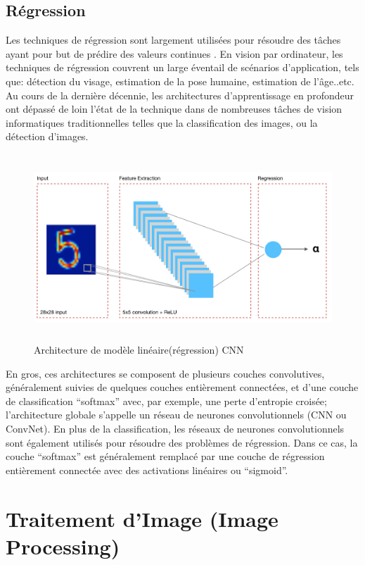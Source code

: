 \documentclass[12pt]{article}
\begin{document}
\subsection{Régression}
Les techniques de régression sont largement utilisées pour résoudre des tâches ayant pour but de prédire des valeurs continues \cite{44}. En vision par ordinateur, les techniques de régression couvrent un large éventail de scénarios d'application, tels que: détection du visage, estimation de la pose humaine, estimation de l'âge..etc. Au cours de la dernière décennie, les architectures d’apprentissage en profondeur ont dépassé de loin l’état de la technique dans de nombreuses tâches de vision informatiques traditionnelles telles que la classification des images, ou la détection d’images.

\begin{figure}[h]
	\centering
	\includegraphics[height=7cm,width=15cm]{img-Chapiter-1/REG.png}
	\caption{Architecture de modèle linéaire(régression) CNN}
\end{figure}

En gros, ces architectures se composent de plusieurs couches convolutives, généralement suivies de quelques couches entièrement connectées, et d'une couche de classification “softmax” avec, par exemple, une perte d'entropie croisée; l'architecture globale s'appelle un réseau de neurones convolutionnels (CNN ou ConvNet). En plus de la classification, les réseaux de neurones convolutionnels sont également utilisés pour résoudre des problèmes de régression. Dans ce cas, la couche “softmax” est généralement remplacé par une couche de régression entièrement connectée avec des activations linéaires ou “sigmoid”.

\newpage
\section{Traitement d’Image (Image Processing)}
\end{document}
